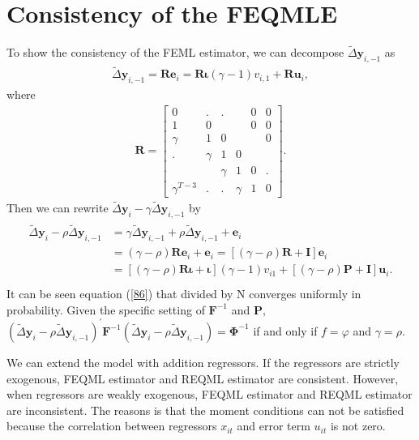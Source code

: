 \documentclass[12pt,a4paper,hyperref]{article}
\begin{document}
\section{Consistency of the FEQMLE} \label{F}
To show the consistency of the FEML estimator, we can decompose $\tilde{\Delta}\boldsymbol{y}_{i,-1}$ as
\begin{align}
\tilde{\Delta}\boldsymbol{y}_{i,-1}=\boldsymbol{R}\boldsymbol{e}_{i}=\boldsymbol{R}\boldsymbol{\iota}\left( \gamma-1 \right)v_{i,1}+\boldsymbol{R}\boldsymbol{u}_{i},
\end{align}
where
\begin{align}
\boldsymbol{R}=
\begin{bmatrix}
0      & .      & .&  &0 & 0\\
1      & 0      &  &  &0 & 0 \\
\gamma & 1      &0 &  &  &0 \\
.       & \gamma &1 & 0 & &    \\
     &   &  \gamma & 1 & 0  &. \\
\gamma^{T-3} & . & . & \gamma &1 & 0
\end{bmatrix}.
\end{align}
Then we can rewrite $\tilde{\Delta}\boldsymbol{y}_{i}-\gamma \tilde{\Delta}\boldsymbol{y}_{i,-1}$ by
\begin{align}
\begin{split}
\tilde{\Delta}\boldsymbol{y}_{i}-\rho \tilde{\Delta}\boldsymbol{y}_{i,-1} &=\gamma \tilde{\Delta}\boldsymbol{y}_{i,-1}+\rho \tilde{\Delta}\boldsymbol{y}_{i,-1}+\boldsymbol{e}_{i} \\
&=\left( \gamma-\rho \right)\boldsymbol{Re}_{i}+\boldsymbol{e}_{i} =\left[ \left( \gamma-\rho  \right)\boldsymbol{R}+\boldsymbol{I}  \right]\boldsymbol{e}_{i} \\
&=\left[\left( \gamma-\rho  \right)\boldsymbol{R\iota}+\boldsymbol{\iota} \right] \left( \gamma-1 \right)v_{i1}+\left[\left(\gamma-\rho \right)\boldsymbol{P}+\boldsymbol{I} \right]\boldsymbol{u}_{i}. \\ \label{86}
\end{split}
\end{align}
It can be seen equation (\ref{86}) that divided by N converges uniformly in probability. Given the specific setting of $\boldsymbol{F}^{-1}$ and $\boldsymbol{P}$, $(\tilde{\Delta}\boldsymbol{y}_{i}-\rho\tilde{\Delta}\boldsymbol{y}_{i,-1})^{'}\boldsymbol{F}^{-1}(\tilde{\Delta}\boldsymbol{y}_{i}-\rho\tilde{\Delta}\boldsymbol{y}_{i,-1})=\boldsymbol{\Phi}^{-1}$ if and only if $f=\varphi$ and $\gamma=\rho$.

We can extend the model with addition regressors. If the regressors are strictly exogenous, FEQML estimator and REQML estimator are consistent. However, when regressors are weakly exogenous, FEQML estimator and REQML estimator are inconsistent. The reasons is that the moment conditions can not be satisfied because the correlation between regressors $x_{it}$ and error term $u_{it}$ is not zero.



\nocite{*}

\renewcommand\refname{References}


\end{document}
